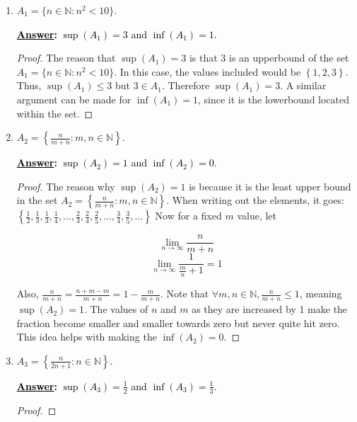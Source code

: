 \documentclass[10pt]{article}
\begin{document}
\begin{enumerate}
	\begin{enumerate}
\item  $A_1 = \{n \in \mathbb{N}: n^2 < 10\}$.
  \par \medskip
	\textbf{\textcolor{black}{\underline{Answer}:}}
\textcolor{black}{$\sup{(A_1)}=3$ and $\inf{(A_1)} = 1$.}
\begin{proof}
  The reason that $\sup{(A_1)}=3$ is that 3 is an upperbound of the set $A_1 = \{n \in \mathbb{N}: n^2 < 10\}$.  In this case, the values included would be $\left\{1,2,3\right\}$.  Thus, $\sup{(A_1)} \leq 3$ but $3 \in A_1$.  Therefore $\sup{(A_1)}=3$.  A similar argument can be made for $\inf{(A_1)} = 1$, since it is the lowerbound located within the set.  
\end{proof}  

	
	\item  $A_2 = \left\{\frac{n}{m+n}: m, n \in \mathbb{N}\right\}$.
	\par \medskip
	\textbf{\textcolor{black}{\underline{Answer}:}}
\textcolor{black}{$\sup{(A_2)}=1$ and $\inf{(A_2)} = 0$.}
\begin{proof}
The reason why $\sup{(A_2)}=1$ is because it is the least upper bound in the set $A_2 = \left\{\frac{n}{m+n}: m, n \in \mathbb{N}\right\}$.  When writing out the elements, it goes:$\left\{\frac{1}{2}, \frac{1}{3}, \frac{1}{3}, \frac{1}{4},...,\frac{2}{3}, \frac{2}{4}, \frac{2}{5},...,\frac{3}{4}, \frac{3}{5}, ...\right\}$ Now for a fixed $m$ value, let 
\begin{center}
\[\lim_{n\to\infty} \frac{n}{m+n}\] 
\[\lim_{n\to\infty} \frac{1}{\frac{m}{n} + 1} = 1\]
\end{center}
Also, $\frac{n}{m+n} = \frac{n+m-m}{m+n}=1-\frac{m}{m+n}$.  Note that $\forall m, n \in \mathbb{N}, \frac{n}{m+n} \leq 1$, meaning $\sup{(A_2)} =1$.
The values of $n$ and $m$ as they are increased by 1 make the fraction become smaller and smaller towards zero but never quite hit zero.  This idea helps with making the $\inf{(A_2)} = 0$.  
\end{proof}
	\item  $A_3 = \left\{\frac{n}{2n+1}: n \in \mathbb{N}\right\}$.
		\par \medskip
	\textbf{\textcolor{black}{\underline{Answer}:}}
\textcolor{black}{$\sup{(A_3)}=\frac{1}{2}$ and $\inf{(A_3)} = \frac{1}{3}$.}
\begin{proof}

\end{proof}
\end{enumerate}
\end{enumerate}
\end{document}
